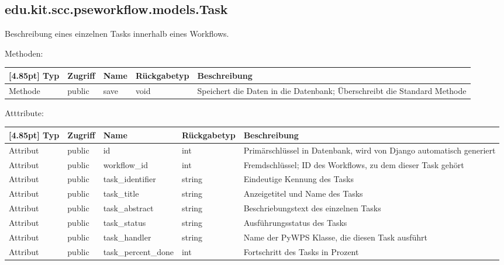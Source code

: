 		
		\subsection{edu.kit.scc.pseworkflow.models.Task}
			Beschreibung eines einzelnen Tasks innerhalb eines Workflows.
			
			Methoden:
			\begin{center}
				\setlength\tabcolsep{5pt}
				\renewcommand{\arraystretch}{1.5}
				
				\begin{tabularx}{\textwidth}{|l|l|l|l|X|}
					\hline
					\rowcolor[gray]{0.75}[4.85pt]
					Typ & Zugriff & Name & Rückgabetyp & Beschreibung \\ \hline 
					Methode & public & save & void & Speichert die Daten in die Datenbank; Überschreibt die Standard Methode \\ 
					\hline
				\end{tabularx}
			\end{center}
			
			Atttribute:
			\begin{center}
				\setlength\tabcolsep{5pt}
				\renewcommand{\arraystretch}{1.5}
				
				\begin{tabularx}{\textwidth}{|l|l|l|l|X|}
					\hline
					\rowcolor[gray]{0.75}[4.85pt]
					Typ & Zugriff & Name & Rückgabetyp & Beschreibung \\ \hline 
					Attribut & public & id & int & Primärschlüssel in Datenbank, wird von Django automatisch generiert \\ \hline
					Attribut & public & workflow\_id & int & Fremdschlüssel; ID des Workflows, zu dem dieser Task gehört \\ \hline
					Attribut & public & task\_identifier & string & Eindeutige Kennung des Tasks \\ \hline
					Attribut & public & task\_title & string & Anzeigetitel und Name des Tasks \\ \hline
					Attribut & public & task\_abstract & string & Beschriebungstext des einzelnen Tasks \\ \hline
					Attribut & public & task\_status & string & Ausführungsstatus des Tasks \\ \hline
					Attribut & public & task\_handler & string & Name der PyWPS Klasse, die diesen Task ausführt \\ \hline
					Attribut & public & task\_percent\_done & int & Fortschritt des Tasks in Prozent \\
					\hline
				\end{tabularx}
			\end{center}
 
